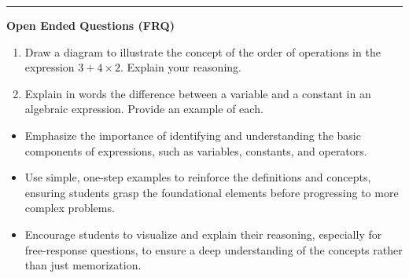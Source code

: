 \documentclass[10pt]{article}
\begin{document}
\vspace{-0.2cm}
\hrule
\vspace{0.2cm}
\textbf{\small Open Ended Questions (FRQ)}
\begin{enumerate}[label=\textbf{Q\arabic*.}, start=9, itemsep=5pt, topsep=0pt]

  \item \small Draw a diagram to illustrate the concept of the order of operations in the expression $3 + 4 \times 2$. Explain your reasoning. \vspace{2cm}

  \item \small Explain in words the difference between a variable and a constant in an algebraic expression. Provide an example of each. \vspace{2cm}

\end{enumerate}

\vfill

\begin{tcolorbox}[colback=blue!5, colframe=mainblue!50, title=\small \textbf{Chef's Tips}, fonttitle=\bfseries, bottom=1mm]
\begin{itemize}[noitemsep, topsep=2pt, leftmargin=0.5cm]
  \item \scriptsize Emphasize the importance of identifying and understanding the basic components of expressions, such as variables, constants, and operators.\item \scriptsize Use simple, one-step examples to reinforce the definitions and concepts, ensuring students grasp the foundational elements before progressing to more complex problems.\item \scriptsize Encourage students to visualize and explain their reasoning, especially for free-response questions, to ensure a deep understanding of the concepts rather than just memorization.
\end{itemize}
\end{tcolorbox}
\end{document}
